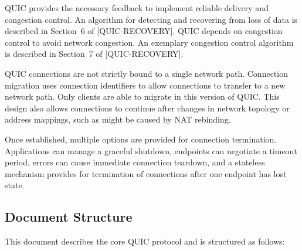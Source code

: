 \documentclass{article}
\begin{document}
QUIC provides the necessary feedback to implement reliable delivery and congestion control.  An algorithm for detecting and recovering from loss of data is described in Section~6 of [QUIC-RECOVERY].  QUIC depends on congestion control to avoid network congestion.  An exemplary congestion control algorithm is described in Section~7 of [QUIC-RECOVERY].

QUIC connections are not strictly bound to a single network path. Connection migration uses connection identifiers to allow connections to transfer to a new network path.  Only clients are able to migrate in this version of QUIC.  This design also allows connections to continue after changes in network topology or address mappings, such as might be caused by NAT rebinding.

Once established, multiple options are provided for connection termination.  Applications can manage a graceful shutdown, endpoints can negotiate a timeout period, errors can cause immediate connection teardown, and a stateless mechanism provides for termination of connections after one endpoint has lost state.

\subsection{Document Structure}

This document describes the core QUIC protocol and is structured as follows:
\end{document}
